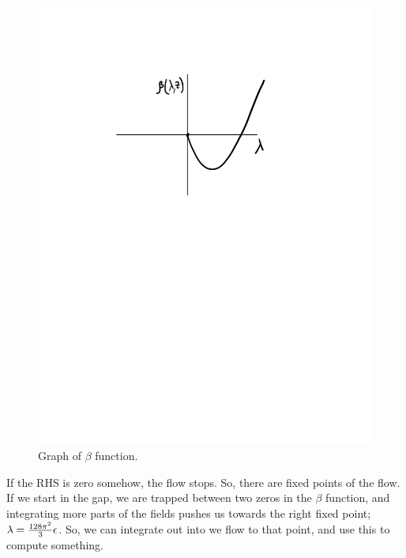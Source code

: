 \begin{figure}[htbp]
    \centering
    \includegraphics[scale=0.7]{Images/fig-betaplot1.pdf}
    \caption{Graph of $\beta$ function.}
    \label{fig-betaplot1}
\end{figure}

If the RHS is zero somehow, the flow stops. So, there are fixed points of the flow. If we start in the gap, we are trapped between two zeros in the $\beta$ function, and integrating more parts of the fields pushes us towards the right fixed point; $\lambda = \frac{128\pi^2}{3}\epsilon$. So, we can integrate out into we flow to that point, and use this to compute something.

